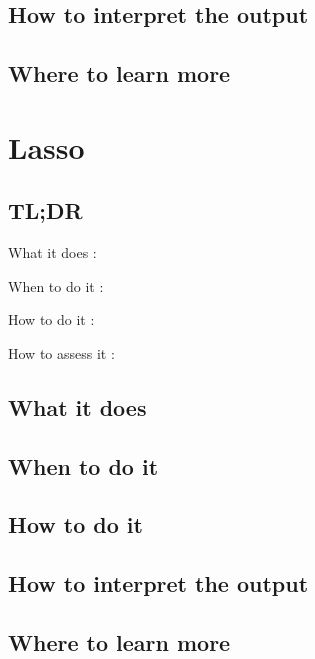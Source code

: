 \documentclass[
]{book}
\begin{document}
\hypertarget{how-to-interpret-the-output-13}{%
\section{How to interpret the output}\label{how-to-interpret-the-output-13}}

\hypertarget{where-to-learn-more-13}{%
\section{Where to learn more}\label{where-to-learn-more-13}}

\hypertarget{lasso}{%
\chapter{Lasso}\label{lasso}}

\hypertarget{tldr-14}{%
\section{TL;DR}\label{tldr-14}}

What it does
:

When to do it
:

How to do it
:

How to assess it
:

\hypertarget{what-it-does-14}{%
\section{What it does}\label{what-it-does-14}}

\hypertarget{when-to-do-it-14}{%
\section{When to do it}\label{when-to-do-it-14}}

\hypertarget{how-to-do-it-14}{%
\section{How to do it}\label{how-to-do-it-14}}

\hypertarget{how-to-interpret-the-output-14}{%
\section{How to interpret the output}\label{how-to-interpret-the-output-14}}

\hypertarget{where-to-learn-more-14}{%
\section{Where to learn more}\label{where-to-learn-more-14}}
\end{document}
